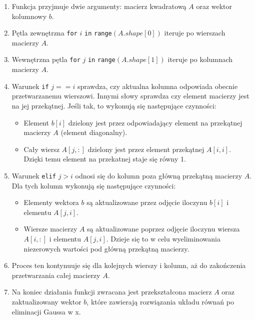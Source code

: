 \documentclass[9pt]{article}
\begin{document}
\begin{enumerate}
    \item Funkcja przyjmuje dwie argumenty: macierz kwadratową $A$ oraz wektor kolumnowy $b$.
    
    \item Pętla zewnętrzna \texttt{for} $i$ \texttt{in} \texttt{range}$(A.shape[0])$ iteruje po wierszach macierzy $A$.
    
    \item Wewnętrzna pętla \texttt{for} $j$ \texttt{in} \texttt{range}$(A.shape[1])$ iteruje po kolumnach macierzy $A$.
    
    \item Warunek \texttt{if} $j == i$ sprawdza, czy aktualna kolumna odpowiada obecnie przetwarzanemu wierszowi. Innymi słowy sprawdza czy element macierzy jest na jej przekątnej. Jeśli tak, to wykonują się następujące czynności:
    \begin{itemize}
        \item Element $b[i]$ dzielony jest przez odpowiadający element na przekątnej macierzy $A$ (element diagonalny).
        \item Cały wiersz $A[j, :]$ dzielony jest przez element przekątnej $A[i, i]$. Dzięki temu element na przekatnej staje się równy $1$.
    \end{itemize}
    
    \item Warunek \texttt{elif} $j > i$ odnosi się do kolumn poza główną przekątną macierzy $A$. Dla tych kolumn wykonują się następujące czynności:
    \begin{itemize}
        \item Elementy wektora $b$ są aktualizowane przez odjęcie iloczynu $b[i]$ i elementu $A[j, i]$.
        \item Wiersze macierzy $A$ są aktualizowane poprzez odjęcie iloczynu wiersza $A[i, :]$ i elementu $A[j, i]$. Dzieje się to w celu wyeliminowania niezerowych wartości pod główną przekątną macierzy.
    \end{itemize}
    
    \item Proces ten kontynuuje się dla kolejnych wierszy i kolumn, aż do zakończenia przetwarzania całej macierzy $A$.
    
    \item Na koniec działania funkcji zwracana jest przekształcona macierz $A$ oraz zaktualizowany wektor $b$, które zawierają rozwiązania układu równań po eliminacji Gaussa w {x}.
\end{enumerate}
\end{document}
